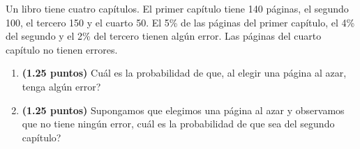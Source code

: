 
Un libro tiene cuatro capítulos. El primer capítulo tiene 140 páginas, el segundo 100, el tercero 150 y el cuarto 50. El 5\% de las páginas del primer capítulo, el 4\% del segundo y el 2\% del tercero tienen algún error. Las páginas del cuarto capítulo no tienen errores.
\begin{enumerate}[label=\alph*)]
\item \textbf{(1.25 puntos)} \textquestiondown{}Cuál es la probabilidad de que, al elegir una página al azar, tenga algún error?
\item \textbf{(1.25 puntos)} Supongamos que elegimos una página al azar y observamos que no tiene ningún error, \textquestiondown{}cuál es la probabilidad de que sea del segundo capítulo?
\end{enumerate}
